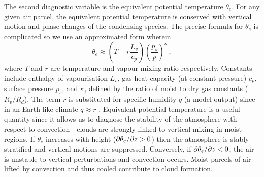 The second diagnostic variable is the equivalent potential temperature $\theta_e$. For any given air parcel, the equivalent potential temperature is conserved with vertical motion and phase changes of the condensing species. The precise formula for $\theta_e$ is complicated \citep{paluch1979-Entrainment, emanuel1994-Atmospheric} so we use an approximated form \citep{stull1988-Introduction} wherein
\begin{equation}\label{eq:theta_e}
    \theta_e \approx \left(T+r\frac{L_v}{c_p}\right)\left(\frac{p_s}{p}\right)^\kappa \,,
\end{equation}
where $T$ and $r$ are temperature and vapour mixing ratio respectively. Constants include enthalpy of vapourisation $L_v$, gas heat capacity (at constant pressure) $c_p$, surface pressure $p_s$, and $\kappa$, defined by the ratio of moist to dry gas constants ($R_v/R_d$). The term $r$ is substituted for specific humidity $q$ (a model output) since in an Earth-like climate $q\approx r$ \citep{vallis2017-Atmospheric}. Equivalent potential temperature is a useful quantity since it allows us to diagnose the stability of the atmosphere with respect to convection---clouds are strongly linked to vertical mixing in moist regions. If $\theta_e$ increases with height ($\partial\theta_e/\partial z > 0$) then the atmosphere is stably stratified and vertical motions are suppressed. Conversely, if $\partial\theta_e/\partial z < 0$, the air is unstable to vertical perturbations and convection occurs. Moist parcels of air lifted by convection and thus cooled contribute to cloud formation.

